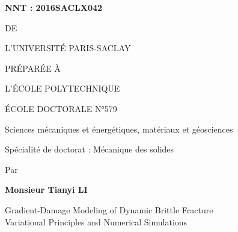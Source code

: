 
\begin{titlepage}

\begin{flushleft}
 \hfill
{}
\end{flushleft}
\vspace{10pt}

\begin{mdframed}
\begin{minipage}[t][22cm][t]{\textwidth}
\begin{flushleft}
\large\textbf{NNT : 2016SACLX042}
\end{flushleft}
\vspace{20pt}

\begin{center}
{\color{color02}{\LARGE THÈSE DE DOCTORAT}

\vspace{8pt}
{\LARGE DE}

\vspace{8pt}
{\LARGE L'UNIVERSITÉ PARIS-SACLAY}

\vspace{8pt}
{\LARGE PRÉPARÉE À}

\vspace{8pt}
{\LARGE L'ÉCOLE POLYTECHNIQUE}}

\vspace{36pt}
{\Large ÉCOLE DOCTORALE N°579}

\vspace{5pt}
{\Large Sciences mécaniques et énergétiques, matériaux et géosciences}

\vspace{16pt}
{\Large Spécialité de doctorat : Mécanique des solides}
\vspace{12pt}

{\large Par}
\vspace{12pt}

{\LARGE\bfseries Monsieur Tianyi LI}
\vspace{36pt}

{\LARGE \sffamily
Gradient-Damage Modeling of Dynamic Brittle Fracture \\ \vspace{0.2cm}
Variational Principles and Numerical Simulations}
\end{center}


\end{minipage}
\end{mdframed}
\end{titlepage}
